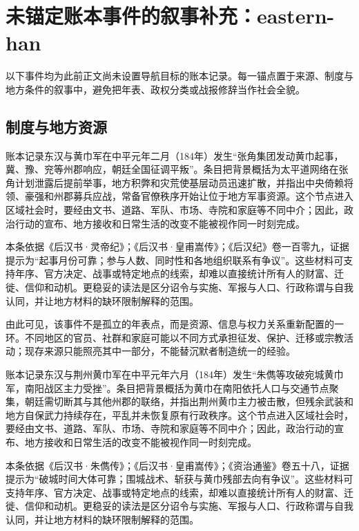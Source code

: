 \section{未锚定账本事件的叙事补充：eastern-han}

\label{sec:anchor-batch-two-eastern-han}

以下事件均为此前正文尚未设置导航目标的账本记录。每一锚点置于来源、制度与地方条件的叙事中，避免把年表、政权分类或战报修辞当作社会全貌。

\subsection{制度与地方资源}

账本记录东汉与黄巾军在中平元年二月（184年）发生“张角集团发动黄巾起事，冀、豫、兖等州郡响应，朝廷全国征调平叛”。条目把背景概括为太平道网络在张角计划泄露后提前举事，地方积弊和灾荒使基层动员迅速扩散，并指出中央倚赖将领、豪强和州郡募兵应战，常备官僚秩序开始让位于地方军事资源。这个节点进入区域社会时，要经由文书、道路、军队、市场、寺院和家庭等不同中介；因此，政治行动的宣布、地方接收和日常生活的改变不能被视作同一时刻完成。

本条依据《后汉书·灵帝纪》；《后汉书·皇甫嵩传》；《后汉纪》卷一百零九，证据提示为“起事月份可靠；参与人数、同时性和各地组织联系有争议”。这些材料可支持年序、官方决定、战事或特定地点的线索，却难以直接统计所有人的财富、迁徙、信仰和动机。更稳妥的读法是区分诏令与实施、军报与人口、行政称谓与自我认同，并让地方材料的缺环限制解释的范围。

由此可见，该事件不是孤立的年表点，而是资源、信息与权力关系重新配置的一环。不同地区的官员、社群和家庭可能以不同方式承担征发、保护、迁移或宗教活动；现存来源只能照亮其中一部分，不能替沉默者制造统一的经验。

账本记录东汉与荆州黄巾军在中平元年六月（184年）发生“朱儁等攻破宛城黄巾军，南阳战区主力受挫”。条目把背景概括为黄巾在南阳依托人口与交通节点聚集，朝廷需切断其与其他州郡的联络，并指出荆州黄巾主力被击散，但残余武装和地方自保武力持续存在，平乱并未恢复原有行政秩序。这个节点进入区域社会时，要经由文书、道路、军队、市场、寺院和家庭等不同中介；因此，政治行动的宣布、地方接收和日常生活的改变不能被视作同一时刻完成。

本条依据《后汉书·朱儁传》；《后汉书·皇甫嵩传》；《资治通鉴》卷五十八，证据提示为“破城时间大体可靠；围城战术、斩获与黄巾残部去向有争议”。这些材料可支持年序、官方决定、战事或特定地点的线索，却难以直接统计所有人的财富、迁徙、信仰和动机。更稳妥的读法是区分诏令与实施、军报与人口、行政称谓与自我认同，并让地方材料的缺环限制解释的范围。

